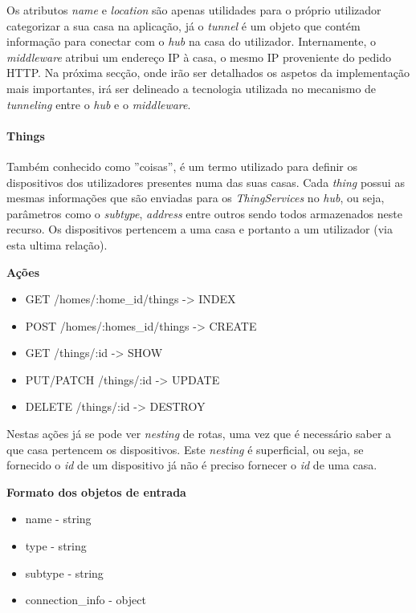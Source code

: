 Os atributos \textit{name} e \textit{location} são apenas utilidades para o próprio utilizador categorizar a sua casa na aplicação, já o \textit{tunnel} é um objeto que contém informação para conectar com o \textit{hub} na casa do utilizador. Internamente, o \textit{middleware} atribui um endereço IP à casa, o mesmo IP proveniente do pedido HTTP. Na próxima secção, onde irão ser detalhados os aspetos da implementação mais importantes, irá ser delineado a tecnologia utilizada no mecanismo de \textit{tunneling} entre o \textit{hub} e o \textit{middleware}.

\paragraph*{Things}

Também conhecido como ''coisas'', é um termo utilizado para definir os dispositivos dos utilizadores presentes numa das suas casas. Cada \textit{thing} possui as mesmas informações que são enviadas para os \textit{ThingServices} no \textit{hub}, ou seja, parâmetros como o \textit{subtype}, \textit{address} entre outros sendo todos armazenados neste recurso. Os dispositivos pertencem a uma casa e portanto a um utilizador (via esta ultima relação).

\textbf{Ações}
\begin{itemize}
    \item GET /homes/:home{\_}id/things -> INDEX
    \item POST /homes/:homes{\_}id/things -> CREATE
    \item GET /things/:id -> SHOW
    \item PUT/PATCH /things/:id -> UPDATE
    \item DELETE /things/:id -> DESTROY
\end{itemize}

Nestas ações já se pode ver \textit{nesting} de rotas, uma vez que é necessário saber a que casa pertencem os dispositivos. Este \textit{nesting} é superficial, ou seja, se fornecido o \textit{id} de um dispositivo já não é preciso fornecer o \textit{id} de uma casa.

\textbf{Formato dos objetos de entrada}
\begin{itemize}
    \item name - string
    \item type - string
    \item subtype - string
    \item connection{\_}info - object
\end{itemize}

